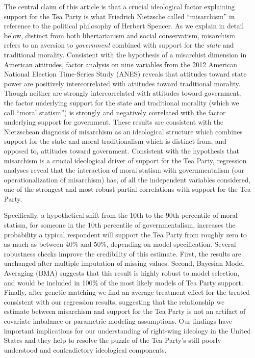 \documentclass[12pt,]{article}
\begin{document}
The central claim of this article is that a crucial ideological factor
explaining support for the Tea Party is what Friedrich Nietzsche called
``misarchism'' in reference to the political philosophy of Herbert
Spencer. As we explain in detail below, distinct from both
libertarianism and social conservatism, misarchism refers to an aversion
to \emph{government} combined with support for the \emph{state} and
traditional morality. Consistent with the hypothesis of a misarchist
dimension in American attitudes, factor analysis on nine variables from
the 2012 American National Election Time-Series Study (ANES) reveals
that attitudes toward state power are positively intercorrelated with
attitudes toward traditional morality. Though neither are strongly
intercorrelated with attitudes toward government, the factor underlying
support for the state and traditional morality (which we call ``moral
statism'') is strongly and negatively correlated with the factor
underlying support for government. These results are consistent with the
Nietzschean diagnosis of misarchism as an ideological structure which
combines support for the state and moral traditionalism which is
distinct from, and opposed to, attitudes toward government. Consistent
with the hypothesis that misarchism is a crucial ideological driver of
support for the Tea Party, regression analyses reveal that the
interaction of moral statism with governmentalism (our
operationalization of misarchism) has, of all the independent variables
considered, one of the strongest and most robust partial correlations
with support for the Tea Party.

Specifically, a hypothetical shift from the 10th to the 90th percentile
of moral statism, for someone in the 10th percentile of governmentalism,
increases the probability a typical respondent will support the Tea
Party from roughly zero to as much as between 40\% and 50\%, depending
on model specification. Several robustness checks improve the
credibility of this estimate. First, the results are unchanged after
multiple imputation of missing values. Second, Bayesian Model Averaging
(BMA) suggests that this result is highly robust to model selection, and
would be included in 100\% of the most likely models of Tea Party
support. Finally, after genetic matching we find an average treatment
effect for the treated consistent with our regression results,
suggesting that the relationship we estimate between misarchism and
support for the Tea Party is not an artifact of covariate imbalance or
parametric modeling assumptions. Our findings have important
implications for our understanding of right-wing ideology in the United
States and they help to resolve the puzzle of the Tea Party's still
poorly understood and contradictory ideological components.
\end{document}
